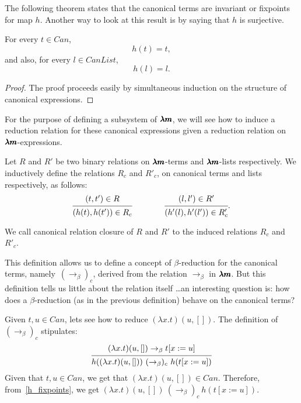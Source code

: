 The following theorem states that the canonical terms are invariant or fixpoints for map $h$.
Another way to look at this result is by saying that $h$ is surjective.

\begin{proposition}
  \label{h_fixpoints}
  For every $t \in Can$, \[ h(t) = t, \]
  and also, for every $l \in CanList$, \[ h(l) = l. \]
\end{proposition}
\begin{proof}
  The proof proceeds easily by simultaneous induction on the structure of canonical expressions.
\end{proof}

For the purpose of defining a subsystem of $\pmb{\lambda m}$, we will see how to induce a reduction relation for these canonical expressions given a reduction relation on $\pmb{\lambda m}$-expressions.

\begin{definition}
  \label{canonical_closure}
  Let $R$ and $R'$ be two binary relations on $\pmb{\lambda m}$-terms and $\pmb{\lambda m}$-lists respectively.
  We inductively define the relations $R_c$ and $R'_c$, on canonical terms and lists respectively, as follows:
  \[
    \begin{prooftree}
      \hypo{ (t, t') \in R }
      \infer1{ (h(t), h(t')) \in R_c } 
    \end{prooftree}
    \qquad \qquad
    \begin{prooftree}
      \hypo{ (l, l') \in R' }
      \infer1{ (h'(l), h'(l')) \in R'_c } 
    \end{prooftree}.
  \]

  We call canonical relation closure of $R$ and $R'$ to the induced relations $R_c$ and $R'_c$.
\end{definition}

This definition allows us to define a concept of $\beta$-reduction for the canonical terms, namely~${(\to_\beta)}_c$, derived from the relation $\to_\beta$ in $\pmb{\lambda m}$.
But this definition tells us little about the relation itself \dots an interesting question is: how does a $\beta$-reduction (as in the previous definition) behave on the canonical terms?

Given $t, u \in Can$, lets see how to reduce $(\lambda x . t)(u, [])$.
The definition of $(\to_\beta)_c$ stipulates: 
\[ \begin{prooftree}
    \hypo{ (\lambda x.t)(u, []) \to_\beta t[x := u] }
    \infer1[]{ h((\lambda x.t)(u, [])) \ (\to_\beta)_c \ h(t[x := u]) }
  \end{prooftree} \]
Given that $t, u \in Can$, we get that $(\lambda x.t)(u, []) \in Can$.
Therefore, from~\cref{h_fixpoints}, we get $(\lambda x.t)(u, []) \ (\to_\beta)_c \ h(t[x := u])$.

